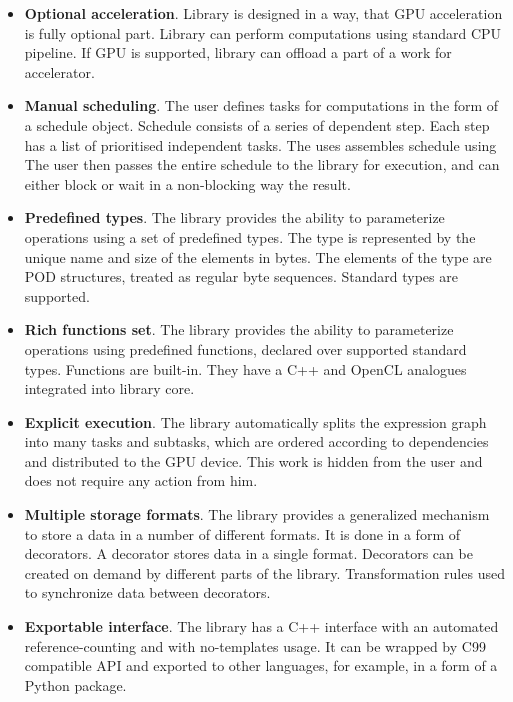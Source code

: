\begin{itemize}
    \item \textbf{Optional acceleration}. Library is designed in a way, that GPU acceleration is fully optional part. Library can perform computations using standard CPU pipeline. If GPU is supported, library can offload a part of a work for accelerator.

    \item \textbf{Manual scheduling}. The user defines tasks for computations in the form of a schedule object. Schedule consists of a series of dependent step. Each step has a list of prioritised independent tasks. The uses assembles schedule using  The user then passes the entire schedule to the library for execution, and can either block or wait in a non-blocking way the result.
    
    \item \textbf{Predefined types}. The library provides the ability to parameterize operations using a set of predefined types. The type is represented by the unique name and size of the elements in bytes. The elements of the type are POD structures, treated as regular byte sequences. Standard types are supported.
    
    \item \textbf{Rich functions set}. The library provides the ability to parameterize operations using predefined functions, declared over supported standard types. Functions are built-in. They have a C++ and OpenCL analogues integrated into library core.  
    
    \item \textbf{Explicit execution}. The library automatically splits the expression graph into many tasks and subtasks, which are ordered according to dependencies and distributed to the GPU device. This work is hidden from the user and does not require any action from him.
    
    \item \textbf{Multiple storage formats}. The library provides a generalized mechanism to store a data in a number of different formats. It is done in a form of decorators. A decorator stores data in a single format. Decorators can be created on demand by different parts of the library. Transformation rules used to synchronize data between decorators.
    
    \item \textbf{Exportable interface}. The library has a C++ interface with an automated reference-counting and with no-templates usage. It can be wrapped by C99 compatible API and exported to other languages, for example, in a form of a Python package.
\end{itemize}


